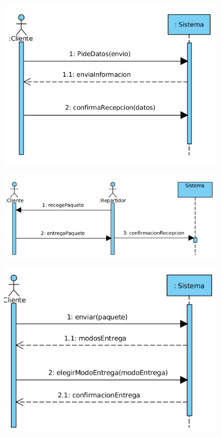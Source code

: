 \begin{figure}[H]
	\centering
	\includegraphics[width=16cm]{45}
\end{figure}
\begin{figure}[H]
	\centering
	\includegraphics[width=16cm]{46}
\end{figure}
\begin{figure}[H]
	\centering
	\includegraphics[width=16cm]{47}
\end{figure}
